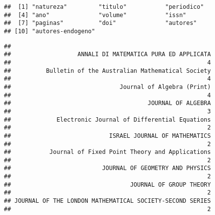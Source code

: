 \documentclass[]{article}
\newenvironment{Shaded}{\begin{snugshade}}{\end{snugshade}}
\newcommand{\KeywordTok}[1]{\textcolor[rgb]{0.13,0.29,0.53}{\textbf{#1}}}
\newcommand{\DataTypeTok}[1]{\textcolor[rgb]{0.13,0.29,0.53}{#1}}
\newcommand{\DecValTok}[1]{\textcolor[rgb]{0.00,0.00,0.81}{#1}}
\newcommand{\StringTok}[1]{\textcolor[rgb]{0.31,0.60,0.02}{#1}}
\newcommand{\OtherTok}[1]{\textcolor[rgb]{0.56,0.35,0.01}{#1}}
\newcommand{\OperatorTok}[1]{\textcolor[rgb]{0.81,0.36,0.00}{\textbf{#1}}}
\newcommand{\NormalTok}[1]{#1}
\begin{document}
\begin{Shaded}
\end{Shaded}

\begin{verbatim}
##  [1] "natureza"         "titulo"           "periodico"       
##  [4] "ano"              "volume"           "issn"            
##  [7] "paginas"          "doi"              "autores"         
## [10] "autores-endogeno"
\end{verbatim}

\begin{Shaded}
\end{Shaded}

\begin{verbatim}
## 
##                   ANNALI DI MATEMATICA PURA ED APPLICATA 
##                                                        4 
##          Bulletin of the Australian Mathematical Society 
##                                                        4 
##                               Journal of Algebra (Print) 
##                                                        4 
##                                       JOURNAL OF ALGEBRA 
##                                                        3 
##             Electronic Journal of Differential Equations 
##                                                        2 
##                            ISRAEL JOURNAL OF MATHEMATICS 
##                                                        2 
##           Journal of Fixed Point Theory and Applications 
##                                                        2 
##                          JOURNAL OF GEOMETRY AND PHYSICS 
##                                                        2 
##                                  JOURNAL OF GROUP THEORY 
##                                                        2 
## JOURNAL OF THE LONDON MATHEMATICAL SOCIETY-SECOND SERIES 
##                                                        2
\end{verbatim}
\end{document}
